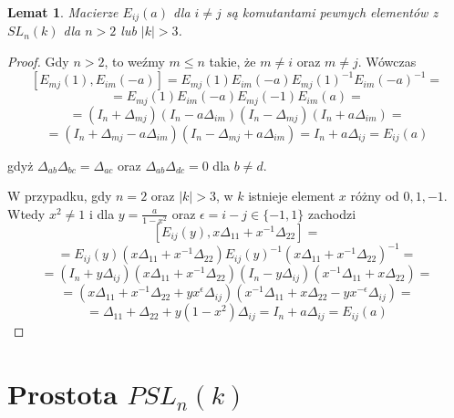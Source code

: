 \documentclass[licencjacka]{pracamgr}
\newtheorem{lemma}{Lemat}[section]
\begin{document}
\begin{lemma}\label{lemma_Eij_are_commutants}
  Macierze $E_{i j}(a)$ dla $i \ne j$ są komutantami pewnych elementów z $SL_n(k)$ dla $n > 2$ lub $|k| > 3$.
\end{lemma}
\begin{proof}
  Gdy $n > 2$, to weźmy $m \le n$ takie, że $m \ne i$ oraz $m \ne j$. Wówczas
  $$ [ E_{m j}(1), E_{i m}(-a) ] = E_{m j}(1) E_{i m}(-a) E_{m j}(1)^{-1} E_{i m}(-a) ^{-1} = $$
  $$ = E_{m j}(1) E_{i m}(-a) E_{m j}(-1) E_{i m}(a) = $$
  $$ = (I_n + \Delta_{m j})(I_n -a \Delta_{i m})(I_n - \Delta_{m j}) (I_n + a \Delta_{i m}) = $$
  $$ = (I_n + \Delta_{m j} - a \Delta_{i m}) (I_n - \Delta_{m j} + a \Delta_{i m}) = I_n + a \Delta_{i j} = E_{i j}(a)$$

  gdyż $\Delta_{a b} \Delta_{b c} = \Delta_{a c}$ oraz $\Delta_{a b} \Delta_{d c} = 0$ dla $b \ne d$.

  W przypadku, gdy $n = 2$ oraz $|k| > 3$, w $k$ istnieje element $x$ różny od $0, 1, -1$.
  Wtedy $x^2 \ne 1$ i dla $y = \frac{a}{1 - x^2}$ oraz $\epsilon = i - j \in \{-1, 1\}$ zachodzi
  $$ [ E_{i j}(y), x \Delta_{1 1} + x^{-1} \Delta_{2 2}] = $$
  $$ = E_{i j}(y)(x \Delta_{1 1} + x^{-1} \Delta_{2 2}) E_{i j}(y)^{-1} (x \Delta_{1 1} + x^{-1} \Delta_{2 2})^{-1} = $$
  $$ = (I_n + y \Delta_{i j})(x \Delta_{1 1} + x^{-1} \Delta_{2 2}) (I_n -y \Delta_{i j}) (x^{-1} \Delta_{1 1} + x \Delta_{2 2}) = $$
  $$ = (x \Delta_{1 1} + x^{-1} \Delta_{2 2} + y x^\epsilon \Delta_{i j}) (x^{-1} \Delta_{1 1} + x \Delta_{2 2} - y x^{-\epsilon} \Delta_{i j}) = $$
  $$ = \Delta_{1 1} + \Delta_{2 2} + y (1-x^2) \Delta_{i j}= I_n + a \Delta_{i j} = E_{i j}(a) $$
\end{proof}


\section{Prostota $PSL_n(k)$}
\end{document}
